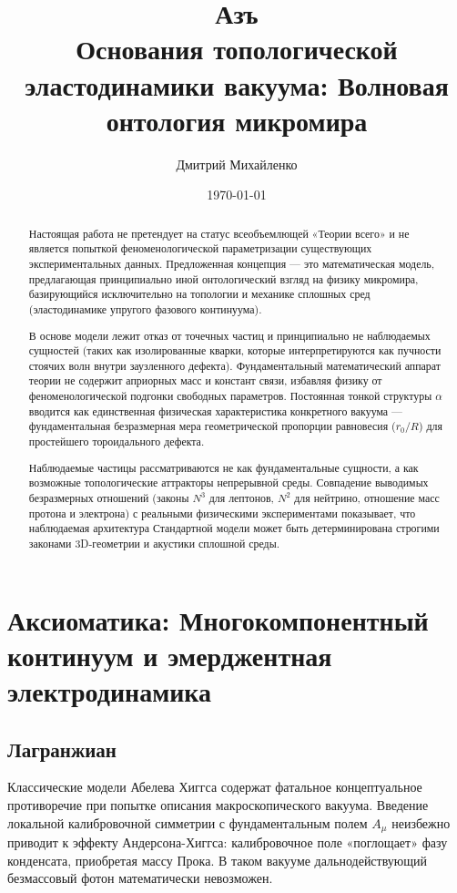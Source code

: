 \documentclass[11pt,a4paper]{article}
\title{\textbf{Азъ\\ Основания топологической эластодинамики вакуума: Волновая онтология микромира}}
\author{Дмитрий Михайленко}
\date{\today}
\begin{document}
	
	\maketitle
	
	\begin{abstract}
	Настоящая работа не претендует на статус всеобъемлющей «Теории всего» и не является попыткой феноменологической параметризации существующих экспериментальных данных. Предложенная концепция — это математическая модель, предлагающая принципиально иной онтологический взгляд на физику микромира, базирующийся исключительно на топологии и механике сплошных сред (эластодинамике упругого фазового континуума).
		
		В основе модели лежит отказ от точечных частиц и принципиально не наблюдаемых сущностей (таких как изолированные кварки, которые интерпретируются как пучности стоячих волн внутри заузленного дефекта). Фундаментальный математический аппарат теории не содержит априорных масс и констант связи, избавляя физику от феноменологической подгонки свободных параметров. Постоянная тонкой структуры $\alpha$ вводится как единственная физическая характеристика конкретного вакуума — фундаментальная безразмерная мера геометрической пропорции равновесия ($r_0/R$) для простейшего тороидального дефекта. 
		
		Наблюдаемые частицы рассматриваются не как фундаментальные сущности, а как возможные топологические аттракторы непрерывной среды. Совпадение выводимых безразмерных отношений (законы $N^3$ для лептонов, $N^2$ для нейтрино, отношение масс протона и электрона) с реальными физическими экспериментами показывает, что наблюдаемая архитектура Стандартной модели может быть детерминирована строгими законами 3D-геометрии и акустики сплошной среды.
	\end{abstract}
	
	\section{Аксиоматика: Многокомпонентный континуум и эмерджентная электродинамика}
	
	\subsection{Лагранжиан}
	Классические модели Абелева Хиггса содержат фатальное концептуальное противоречие при попытке описания макроскопического вакуума. Введение локальной калибровочной симметрии с фундаментальным полем $A_\mu$ неизбежно приводит к эффекту Андерсона-Хиггса: калибровочное поле «поглощает» фазу конденсата, приобретая массу Прока. В таком вакууме дальнодействующий безмассовый фотон математически невозможен.
	
\end{document}
